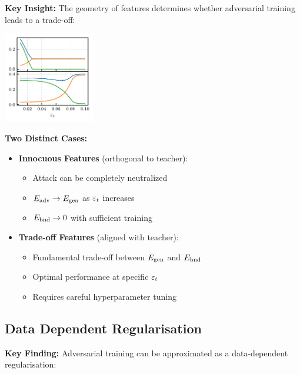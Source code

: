 \documentclass[a0paper,fleqn]{betterportraitposter}
\theoremstyle{plain}
\theoremstyle{definition}
\theoremstyle{remark}
\begin{document}
{\begin{multicols}{3}
\textbf{Key Insight:} The geometry of features determines whether adversarial training leads to a trade-off:

\begin{center}
\includegraphics[width=0.3\textwidth]{Assets/optimal_defense.pdf}
\end{center}

\textbf{Two Distinct Cases:}

\begin{itemize}
    \item \textbf{Innocuous Features} (orthogonal to teacher):
    \begin{itemize}
        \item Attack can be completely neutralized
        \item $E_{\mathrm{adv}} \to E_{\mathrm{gen}}$ as $\varepsilon_t$ increases
        \item $E_{\mathrm{bnd}} \to 0$ with sufficient training
    \end{itemize}
    
    \item \textbf{Trade-off Features} (aligned with teacher):
    \begin{itemize}
        \item Fundamental trade-off between $E_{\mathrm{gen}}$ and $E_{\mathrm{bnd}}$
        \item Optimal performance at specific $\varepsilon_t$
        \item Requires careful hyperparameter tuning
    \end{itemize}
\end{itemize}

\subsection{Data Dependent Regularisation}

\textbf{Key Finding:} Adversarial training can be approximated as a data-dependent regularisation:


\end{multicols}}
\end{document}
